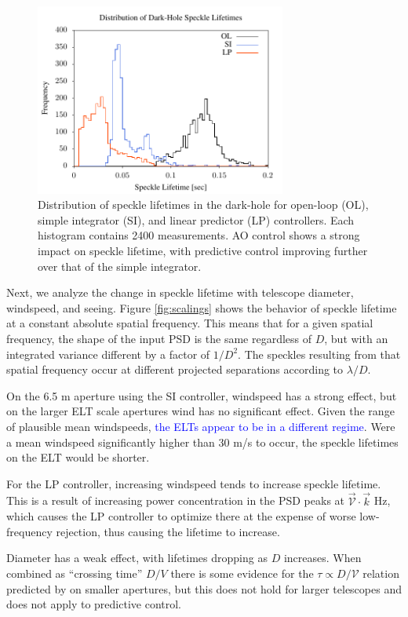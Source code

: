 \documentclass[10pt,preprint]{aastex631}
\newcommand{\jrmadd}[1]{\textcolor{blue}{#1}}
\begin{document}
\begin{figure}[h]
\centering
\includegraphics[width=3.25in]{slHist.pdf}
\caption{Distribution of speckle lifetimes in the dark-hole for open-loop (OL), simple integrator (SI), and linear predictor (LP) controllers. Each histogram contains 2400 measurements.  AO control shows a strong impact on speckle lifetime, with predictive control improving further over that of the simple integrator. 
\label{fig:slHist}
}
\end{figure}

Next, we analyze the change in speckle lifetime with telescope diameter, windspeed, and seeing.  Figure \ref{fig:scalings} shows the behavior of speckle lifetime at a constant absolute spatial frequency.  This means that for a given spatial frequency, the shape of the input PSD is the same regardless of $D$, but with an integrated variance different by a factor of $1/D^2$.  The speckles resulting from that spatial frequency occur at different projected separations according to $\lambda/D$.  

On the 6.5 m aperture using the SI controller, windspeed has a strong effect, but on the larger ELT scale apertures wind has no significant effect.  Given the range of plausible mean windspeeds, \jrmadd{the ELTs appear to be in a different regime}.  Were a mean windspeed significantly higher than 30 m/s to occur, the speckle lifetimes on the ELT would be shorter.   

For the LP controller, increasing windspeed tends to increase speckle lifetime.  This is a result of increasing power concentration in the PSD peaks at $\vec{\mathcal{V}} \cdot \vec{k}$ Hz, which causes the LP controller to optimize there at the expense of worse low-frequency rejection, thus causing the lifetime to increase.

Diameter has a weak effect, with lifetimes dropping as $D$ increases.  When combined as ``crossing time'' $D/V$ there is some evidence for the $\tau \propto D/\mathcal{V}$ relation predicted by \citet{2005SPIE.5903..170M} on smaller apertures, but this does not hold for larger telescopes and does not apply to predictive control.  
\end{document}
